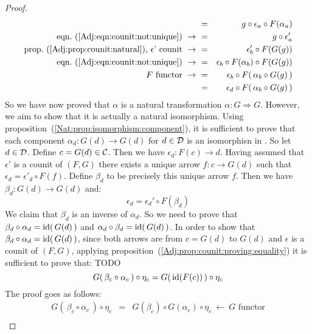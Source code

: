 \begin{proof}
\begin{eqnarray*}
            &=&g\circ\epsilon_{a}\circ F(\alpha_{a})\\
            \mbox{eqn.~(\ref{Adj:eqn:counit:not:unique})}\ \to\ 
            &=&g\circ\epsilon_{a}'\\
            \mbox{prop.~(\ref{Adj:prop:counit:natural}), $\epsilon$' counit}\ \to\ 
            &=&\epsilon_{b}'\circ F(G(g))\\
            \mbox{eqn.~(\ref{Adj:eqn:counit:not:unique})}\ \to\ 
            &=&\epsilon_{b}\circ F(\alpha_{b})\circ F(G(g))\\
            \mbox{$F$ functor}\ \to\ 
            &=&\epsilon_{b}\circ F(\,\alpha_{b}\circ G(g)\,)\\
            &=&\epsilon_{d}\circ F(\,\alpha_{b}\circ G(g)\,)\\
        \end{eqnarray*}
    So we have now proved that $\alpha$ is a natural transformation
    $\alpha:G\Rightarrow G$. However, we aim to show that it is actually
    a natural isomorphism. 
    Using proposition~(\ref{Nat:prop:isomorphism:component}), it is sufficient
    to prove that each component $\alpha_{d}:G(d)\to G(d)$ for $d\in\mbox{$\cal D$}$ is 
    an isomorphisn in \Cat. So let $d\in\mbox{$\cal D$}$. Define $c=G(d)\in\mbox{$\cal C$}$. Then we 
    have $\epsilon_{d}:F(c)\to d$. Having assumed that $\epsilon'$ is a counit 
    of $(F,G)$ there exists a unique arrow $f:c\to G(d)$ such that 
    $\epsilon_{d}=\epsilon'_{d}\circ F(f)$. Define $\beta_{d}$ to be precisely this 
    unique arrow $f$. Then we have $\beta_{d}:G(d)\to G(d)$ and:
        \begin{equation}\label{Adj:eqn:counit:not:unique:2}
            \epsilon_{d}=\epsilon_{d}'\circ F(\beta_{d})
        \end{equation}
    We claim that $\beta_{d}$ is an inverse of $\alpha_{d}$. So we need to prove 
    that $\beta_{d}\circ\alpha_{d}=\mbox{\rm id}(\,G(d)\,)$ and 
    $\alpha_{d}\circ\beta_{d}=\mbox{\rm id}(\,G(d)\,)$.
    In order to show that $\beta_{d}\circ\alpha_{d}=\mbox{\rm id}(\,G(d)\,)$, since both 
    arrows are from $c=G(d)$ to $G(d)$ and $\epsilon$ is a counit of $(F,G)$, 
    applying proposition~(\ref{Adj:prop:counit:proving:equality}) it is sufficient 
    to prove that:
    TODO
        \[
            G(\,\beta_{c}\circ\alpha_{c}\,)\circ\eta_{c} 
            = 
            G(\,\mbox{\rm id}(F(c))\,)\circ\eta_{c}
        \]
    The proof goes as follows:
        \begin{eqnarray*}G(\,\beta_{c}\circ\alpha_{c}\,)\circ\eta_{c}
            &=&G(\beta_{c})\circ G(\alpha_{c})\circ\eta_{c}
            \ \leftarrow\ \mbox{$G$ functor}\\

\end{eqnarray*}
\end{proof}
